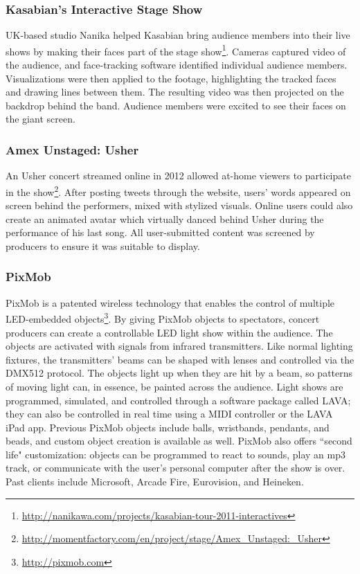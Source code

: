 \subsubsection{Kasabian's Interactive Stage Show}

UK-based studio Nanika helped Kasabian bring audience members into their live shows by making their faces part of the stage show\footnote{\url{http://nanikawa.com/projects/kasabian-tour-2011-interactives}}. Cameras captured video of the audience, and face-tracking software identified individual audience members. Visualizations were then applied to the footage, highlighting the tracked faces and drawing lines between them. The resulting video was then projected on the backdrop behind the band. Audience members were excited to see their faces on the giant screen.

\subsubsection{Amex Unstaged: Usher}
An Usher concert streamed online in 2012 allowed at-home viewers to participate in the show\footnote{\url{http://momentfactory.com/en/project/stage/Amex_Unstaged:_Usher}}. After posting tweets through the website, users' words appeared on screen behind the performers, mixed with stylized visuals. Online users could also create an animated avatar which virtually danced behind Usher during the performance of his last song. All user-submitted content was screened by producers to ensure it was suitable to display. 

\subsubsection{PixMob}

PixMob is a patented wireless technology that enables the control of multiple LED-embedded objects\footnote{\url{http://pixmob.com}}. By giving PixMob objects to spectators, concert producers can create a controllable LED light show within the audience. The objects are activated with signals from infrared transmitters. Like normal lighting fixtures, the transmitters' beams can be shaped with lenses and controlled via the DMX512 protocol. The objects light up when they are hit by a beam, so patterns of moving light can, in essence, be painted across the audience. Light shows are programmed, simulated, and controlled through a software package called LAVA; they can also be controlled in real time using a MIDI controller or the LAVA iPad app. Previous PixMob objects include balls, wristbands, pendants, and beads, and custom object creation is available as well. PixMob also offers ``second life" customization: objects can be programmed to react to sounds, play an mp3 track, or communicate with the user's personal computer after the show is over. Past clients include Microsoft, Arcade Fire, Eurovision, and Heineken.

